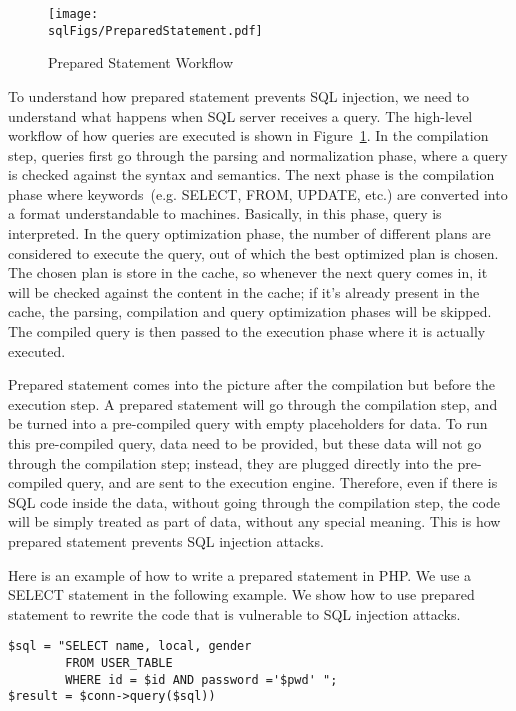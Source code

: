 \begin{figure}
\centering
\texttt{[image: \\sqlFigs/PreparedStatement.pdf]}
\caption{Prepared Statement Workflow}
\label{sql:fig:preparedstatement}
\end{figure}


To understand how prepared statement prevents SQL injection, 
we need to understand what happens when SQL server receives a query. 
The high-level workflow of how queries are executed is shown in Figure~\ref{sql:fig:preparedstatement}.
In the compilation step, queries first go through the parsing and normalization phase, 
where a query is checked against the syntax and semantics. 
The next phase is the compilation phase where keywords~(e.g. SELECT, FROM, UPDATE, etc.) 
are converted into a format understandable to machines. 
Basically, in this phase, query is interpreted.
In the query optimization phase, the number of different plans are considered to 
execute the query,  out of which the best optimized plan is chosen. 
The chosen plan is store in the cache, so 
whenever the next query comes in, 
it will be checked against the content in the cache; if it's already present in the cache,
the parsing, compilation and query optimization phases will be skipped. 
The compiled query is then passed to the execution phase 
where it is actually executed.


Prepared statement comes into the picture after the compilation but before the execution step. 
A prepared statement will go through the compilation step, and be turned into
a pre-compiled query with empty placeholders for data. To run this pre-compiled query,
data need to be provided, but these data will not go through the compilation step; instead,
they are plugged directly into the pre-compiled query, and are sent to the execution engine.
Therefore, even if there is SQL code inside the data, without going through the compilation
step, the code will be simply treated as part of data, without any special meaning.  
This is how prepared statement prevents SQL injection attacks.


Here is an example of how to write a prepared statement in PHP.  We use a SELECT statement in
the following example.  We show how to use prepared statement to rewrite the code that is
vulnerable to SQL injection attacks.


\begin{lstlisting}
$sql = "SELECT name, local, gender  
        FROM USER_TABLE 
        WHERE id = $id AND password ='$pwd' ";
$result = $conn->query($sql)) 
\end{lstlisting}

